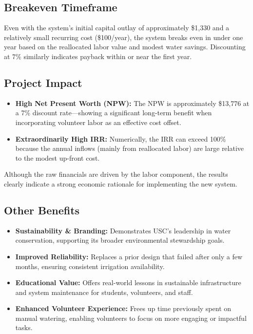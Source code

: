 \documentclass[12pt]{report}
\begin{document}
\subsection{Breakeven Timeframe}
Even with the system’s initial capital outlay of approximately \$1,330 and a relatively small recurring cost (\$100/year), the system breaks even in under one year based on the reallocated labor value and modest water savings. Discounting at 7\% similarly indicates payback within or near the first year. 

\subsection{Project Impact}
\begin{itemize}
    \item \textbf{High Net Present Worth (NPW):} 
    The NPW is approximately \$13,776 at a 7\% discount rate—showing a significant long-term benefit when incorporating volunteer labor as an effective cost offset.
    \item \textbf{Extraordinarily High IRR:} 
    Numerically, the IRR can exceed 100\% because the annual inflows (mainly from reallocated labor) are large relative to the modest up-front cost.
\end{itemize}
Although the raw financials are driven by the labor component, the results clearly indicate a strong economic rationale for implementing the new system.

\subsection{Other Benefits}
\begin{itemize}
    \item \textbf{Sustainability \& Branding:} Demonstrates USC's leadership in water conservation, supporting its broader environmental stewardship goals.
    \item \textbf{Improved Reliability:} Replaces a prior design that failed after only a few months, ensuring consistent irrigation availability.
    \item \textbf{Educational Value:} Offers real-world lessons in sustainable infrastructure and system maintenance for students, volunteers, and staff.
    \item \textbf{Enhanced Volunteer Experience:} Frees up time previously spent on manual watering, enabling volunteers to focus on more engaging or impactful tasks.
\end{itemize}
\end{document}
